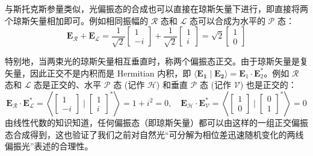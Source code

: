 \documentclass[UTF8]{report}
\theoremstyle{MyLineTheoremStyle} %
\theoremstyle{MyBlockTheoremStyle} %
\theoremstyle{MySubsubsectionStyle} %
\begin{document}
与斯托克斯参量类似，光偏振态的合成也可以直接在琼斯矢量下进行，即直接将两个琼斯矢量相加即可。例如相同振幅的 $\mathscr{R}$ 态和 $\mathscr{L}$ 态可以合成为水平的 $\mathscr{P}$ 态：
\begin{equation}
\boldsymbol{E}_{\mathscr{R}} + \boldsymbol{E}_{\mathscr{L}} =
\frac{1}{\sqrt{2}}
\begin{bmatrix}
    1 \\ 
    -i
\end{bmatrix} 
+
\frac{1}{\sqrt{2}}
\begin{bmatrix}
    1 \\ 
    i
\end{bmatrix} =
\sqrt{2}
\begin{bmatrix}
    1 \\ 
    0
\end{bmatrix}
\end{equation}

特别地，当两束光的琼斯矢量相互垂直时，称两个偏振态正交。由于琼斯矢量是复矢量，因此正交不是内积而是 Hermitian 内积，即 $\langle \boldsymbol{E_1} \mid \boldsymbol{E_2} \rangle = \boldsymbol{E}_1 \cdot \boldsymbol{E}_2^*$。例如 $\mathscr{R}$ 态和 $\mathscr{L}$ 态是正交的、水平 $\mathscr{P}$ 态 (记作 $\mathscr{H}$) 和垂直 $\mathscr{P}$ 态 (记作 $\mathscr{V}$) 也是正交的：
\begin{equation}
\boldsymbol{E_{\mathscr{R}}} \cdot \boldsymbol{E_{\mathscr{L}}^*} =
\left\langle \begin{bmatrix}
    1 \\ 
    -i
\end{bmatrix} 
\mid 
\begin{bmatrix}
    1 \\ i
\end{bmatrix}^*
\right\rangle
= 1 + i^2 = 0
,\quad 
\boldsymbol{E_{\mathscr{H}}} \cdot \boldsymbol{E_{\mathscr{V}}^*} =
\left\langle \begin{bmatrix}
    1 \\ 
    0
\end{bmatrix}
\mid
\begin{bmatrix}
    0 \\ 1
\end{bmatrix}^*
\right\rangle
= 0
\end{equation}
由线性代数的知识知道，任何偏振态（即琼斯矢量）都可以由这样的一组正交偏振态合成得到，这也验证了我们之前对自然光“可分解为相位差迅速随机变化的两线偏振光”表述的合理性。
\end{document}
